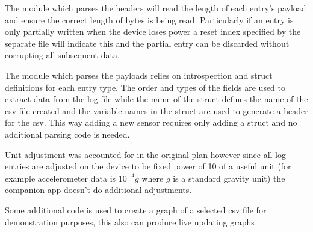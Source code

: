 The module which parses the headers will read the length of each entry's payload and ensure the correct length of bytes is being read.  Particularly if an entry is only partially written when the device loses power a reset index specified by the separate file will indicate this and the partial entry can be discarded without corrupting all subsequent data.

The module which parses the payloads relies on introspection and struct definitions for each entry type.  The order and types of the fields are used to extract data from the log file while the name of the struct defines the name of the csv file created and the variable names in the struct are used to generate a header for the csv.  This way adding a new sensor requires only adding a struct and no additional parsing code is needed.

Unit adjustment was accounted for in the original plan however since all log entries are adjusted on the device to be fixed power of 10 of a useful unit (for example accelerometer data is $10^{-4} g$ where $g$ is a standard gravity unit) the companion app doesn't do additional adjustments. 

Some additional code is used to create a graph of a selected csv file for demonstration purposes, this also can produce live updating graphs

